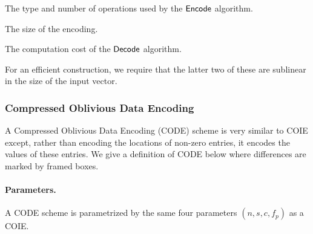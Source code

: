 \BI
\item The type and number of operations used by the $\mathsf{Encode}$ algorithm. 

\item The size of the encoding.

\item The computation cost of the $\mathsf{Decode}$ algorithm.
\EI

For an efficient construction, we require that the latter two of these are sublinear in the size of the input vector.










\subsubsection{Compressed Oblivious Data Encoding}
A Compressed Oblivious Data Encoding (CODE) scheme is very similar to
COIE except, rather than encoding the locations of non-zero entries, it encodes the values of these entries. We give a
definition of CODE below where differences are marked by framed boxes. 


\paragraph{Parameters.} A CODE scheme is parametrized by the same four
parameters $(n,s,c,f_p)$ as a COIE.

